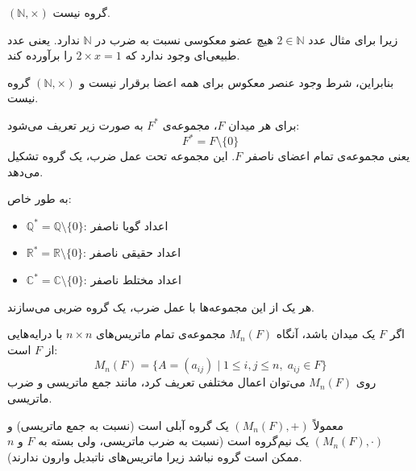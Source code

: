 \begin{example}
    \( (\mathbb{N}, \times) \) گروه نیست.

    زیرا برای مثال عدد \( 2 \in \mathbb{N} \) هیچ عضو معکوسی نسبت به ضرب در \( \mathbb{N} \) ندارد.
    یعنی عدد طبیعی‌ای وجود ندارد که \( 2 \times x = 1 \) را برآورده کند.

    بنابراین، شرط وجود عنصر معکوس برای همه اعضا برقرار نیست و \( (\mathbb{N}, \times) \) گروه نیست.
\end{example}
\begin{definition}
    برای هر میدان \( F \)، مجموعه‌ی \( F^* \) به صورت زیر تعریف می‌شود:
    \[
        F^* = F \setminus \{0\}
    \]
    یعنی مجموعه‌ی تمام اعضای ناصفر \( F \). این مجموعه تحت عمل ضرب، یک گروه تشکیل می‌دهد.

    به طور خاص:
    \begin{itemize}
        \item \( \mathbb{Q}^* = \mathbb{Q} \setminus \{0\} \): اعداد گویا ناصفر
        \item \( \mathbb{R}^* = \mathbb{R} \setminus \{0\} \): اعداد حقیقی ناصفر
        \item \( \mathbb{C}^* = \mathbb{C} \setminus \{0\} \): اعداد مختلط ناصفر
    \end{itemize}
    هر یک از این مجموعه‌ها با عمل ضرب، یک گروه ضربی می‌سازند.
\end{definition}


\begin{definition}
    اگر \( F \) یک میدان  باشد، آنگاه \( M_n(F) \) مجموعه‌ی تمام ماتریس‌های \( n \times n \) با درایه‌هایی از \( F \) است:
    \[
        M_n(F) = \{ A = (a_{ij}) \mid 1 \leq i, j \leq n,\; a_{ij} \in F \}
    \]
    روی \( M_n(F) \) می‌توان اعمال مختلفی تعریف کرد، مانند جمع ماتریسی و ضرب ماتریسی.

    معمولاً \( (M_n(F), +) \) یک گروه آبلی است (نسبت به جمع ماتریسی) و \( (M_n(F), \cdot) \) یک نیم‌گروه است (نسبت به ضرب ماتریسی، ولی بسته به \( F \) و \( n \) ممکن است گروه نباشد زیرا ماتریس‌های ناتبدیل وارون ندارند).
\end{definition}

